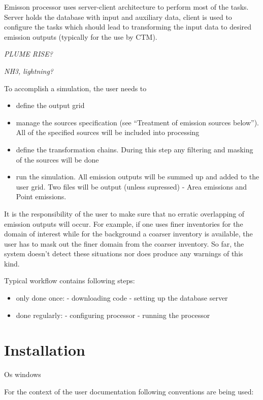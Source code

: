 \documentclass[a4paper,11pt]{article}
\begin{document}
Emisson processor uses server-client architecture to perform most of the
tasks. Server holds the database with input and auxiliary data, client
is used to configure the tasks which should lead to transforming the
input data to desired emission outputs (typically for the use by CTM).

\emph{PLUME RISE?}

\emph{NH3, lightning?}

To accomplish a simulation, the user needs to

\begin{itemize}
\item
  define the output grid
\item
  manage the sources specification (see ``Treatment of emission sources
  below''). All of the specified sources will be included into
  processing
\item
  define the transformation chains. During this step any filtering and
  masking of the sources will be done
\item
  run the simulation. All emission outputs will be summed up and added
  to the user grid. Two files will be output (unless supressed) - Area
  emissions and Point emissions.
\end{itemize}

It is the responsibility of the user to make sure that no erratic
overlapping of emission outputs will occur. For example, if one uses
finer inventories for the domain of interest while for the background a
coarser inventory is available, the user has to mask out the finer
domain from the coarser inventory. So far, the system doesn't detect
these situations nor does produce any warnings of this kind.

Typical workflow contains following steps:

\begin{itemize}
\item
  only done once: - downloading code - setting up the database server
\item
  done regularly: - configuring processor - running the processor
\end{itemize}

\section{Installation}\label{installation}
Os windows

For the context of the user documentation following conventions are
being used:
\end{document}
